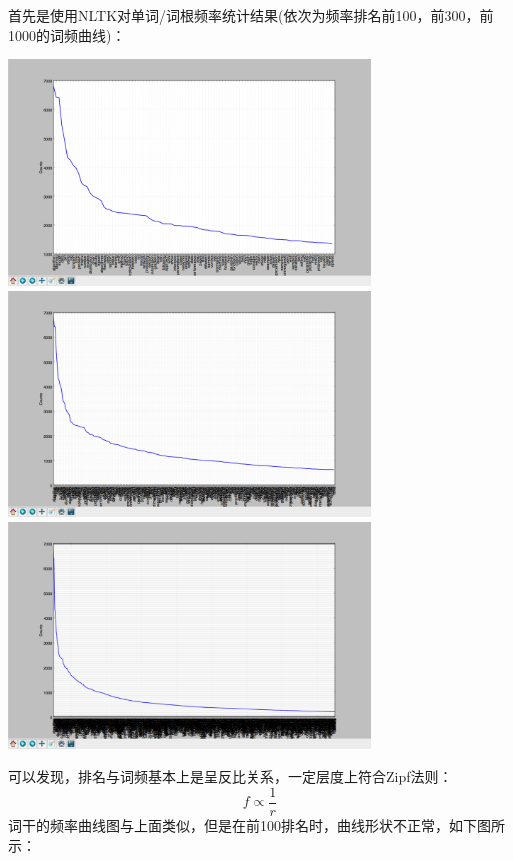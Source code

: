 \documentclass{article}
\begin{document}
首先是使用NLTK对单词/词根频率统计结果(依次为频率排名前100，前300，前1000的词频曲线)：
\begin{center}
	\includegraphics[height=6cm]{result/v1.0/dict-100}
	\includegraphics[height=6cm]{result/v1.0/dict-300}
	\includegraphics[height=6cm]{result/v1.0/dict-1000}
\end{center}
可以发现，排名与词频基本上是呈反比关系，一定层度上符合Zipf法则\cite{3}：
\begin{displaymath}
	f \propto \frac{1}{r}
\end{displaymath}
词干的频率曲线图与上面类似，但是在前100排名时，曲线形状不正常，如下图所示：
\end{document}
